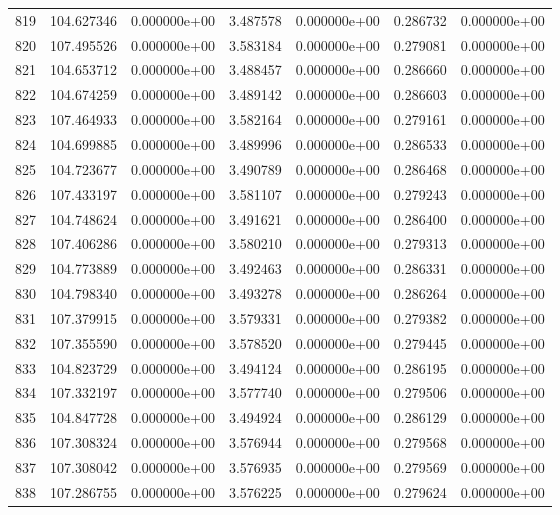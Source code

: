 \begin{tabular}{rrrrrrr}
 819 & 104.627346 &  0.000000e+00 &  3.487578 &  0.000000e+00 &   0.286732 &  0.000000e+00 \\
 820 & 107.495526 &  0.000000e+00 &  3.583184 &  0.000000e+00 &   0.279081 &  0.000000e+00 \\
 821 & 104.653712 &  0.000000e+00 &  3.488457 &  0.000000e+00 &   0.286660 &  0.000000e+00 \\
 822 & 104.674259 &  0.000000e+00 &  3.489142 &  0.000000e+00 &   0.286603 &  0.000000e+00 \\
 823 & 107.464933 &  0.000000e+00 &  3.582164 &  0.000000e+00 &   0.279161 &  0.000000e+00 \\
 824 & 104.699885 &  0.000000e+00 &  3.489996 &  0.000000e+00 &   0.286533 &  0.000000e+00 \\
 825 & 104.723677 &  0.000000e+00 &  3.490789 &  0.000000e+00 &   0.286468 &  0.000000e+00 \\
 826 & 107.433197 &  0.000000e+00 &  3.581107 &  0.000000e+00 &   0.279243 &  0.000000e+00 \\
 827 & 104.748624 &  0.000000e+00 &  3.491621 &  0.000000e+00 &   0.286400 &  0.000000e+00 \\
 828 & 107.406286 &  0.000000e+00 &  3.580210 &  0.000000e+00 &   0.279313 &  0.000000e+00 \\
 829 & 104.773889 &  0.000000e+00 &  3.492463 &  0.000000e+00 &   0.286331 &  0.000000e+00 \\
 830 & 104.798340 &  0.000000e+00 &  3.493278 &  0.000000e+00 &   0.286264 &  0.000000e+00 \\
 831 & 107.379915 &  0.000000e+00 &  3.579331 &  0.000000e+00 &   0.279382 &  0.000000e+00 \\
 832 & 107.355590 &  0.000000e+00 &  3.578520 &  0.000000e+00 &   0.279445 &  0.000000e+00 \\
 833 & 104.823729 &  0.000000e+00 &  3.494124 &  0.000000e+00 &   0.286195 &  0.000000e+00 \\
 834 & 107.332197 &  0.000000e+00 &  3.577740 &  0.000000e+00 &   0.279506 &  0.000000e+00 \\
 835 & 104.847728 &  0.000000e+00 &  3.494924 &  0.000000e+00 &   0.286129 &  0.000000e+00 \\
 836 & 107.308324 &  0.000000e+00 &  3.576944 &  0.000000e+00 &   0.279568 &  0.000000e+00 \\
 837 & 107.308042 &  0.000000e+00 &  3.576935 &  0.000000e+00 &   0.279569 &  0.000000e+00 \\
 838 & 107.286755 &  0.000000e+00 &  3.576225 &  0.000000e+00 &   0.279624 &  0.000000e+00 \\

\end{tabular}
